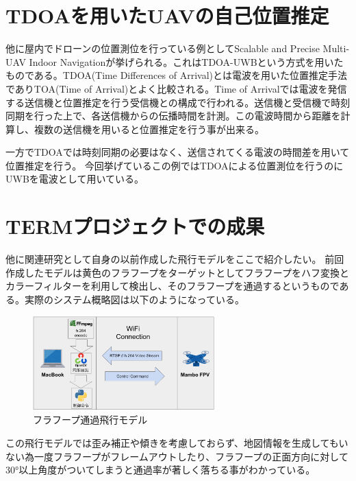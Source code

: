 \section{TDOAを用いたUAVの自己位置推定}
他に屋内でドローンの位置測位を行っている例としてScalable and Precise Multi-UAV Indoor Navigation\cite{TDOA-UWB}が挙げられる。これはTDOA-UWBという方式を用いたものである。TDOA(Time Differences of Arrival)とは電波を用いた位置推定手法でありTOA(Time of Arrival)とよく比較される。Time of Arrivalでは電波を発信する送信機と位置推定を行う受信機との構成で行われる。送信機と受信機で時刻同期を行った上で、各送信機からの伝播時間を計測。この電波時間から距離を計算し、複数の送信機を用いると位置推定を行う事が出来る。

一方でTDOAでは時刻同期の必要はなく、送信されてくる電波の時間差を用いて位置推定を行う。
今回挙げているこの例ではTDOAによる位置測位を行うのにUWBを電波として用いている。


\section{TERMプロジェクトでの成果}
他に関連研究として自身の以前作成した飛行モデルをここで紹介したい。
前回作成したモデルは黄色のフラフープをターゲットとしてフラフープをハフ変換とカラーフィルターを利用して検出し、そのフラフープを通過するというものである。実際のシステム概略図は以下のようになっている。

\begin{figure}[htbp]
  \begin{center}
    \includegraphics[clip,width=7.0cm]{img/term-system.png}
    \caption{フラフープ通過飛行モデル}
    \label{fig:gate}
  \end{center}
\end{figure}

この飛行モデルでは歪み補正や傾きを考慮しておらず、地図情報を生成してもいない為一度フラフープがフレームアウトしたり、フラフープの正面方向に対して30°以上角度がついてしまうと通過率が著しく落ちる事がわかっている。



